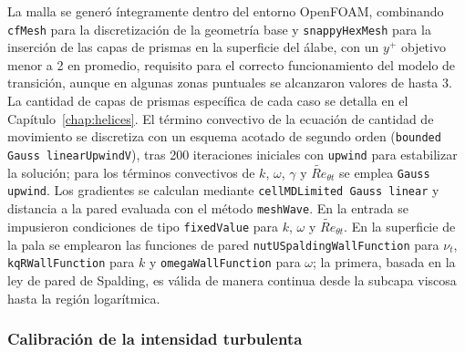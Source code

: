 La malla se generó íntegramente dentro del entorno OpenFOAM, combinando
\texttt{cfMesh} para la discretización de la geometría base y \texttt{snappyHexMesh}
para la inserción de las capas de prismas en la superficie del álabe, con un $y^+$
objetivo menor a 2 en promedio, requisito para el correcto funcionamiento del modelo
de transición, aunque en algunas zonas puntuales se alcanzaron valores de hasta 3.
La cantidad de capas de prismas específica de cada caso se detalla en el
Capítulo~\ref{chap:helices}. El término convectivo de la ecuación de cantidad de movimiento se discretiza con un esquema acotado de segundo orden
(\texttt{bounded Gauss linearUpwindV}), tras 200 iteraciones iniciales con \texttt{upwind}
para estabilizar la solución; para los términos convectivos de $k$, $\omega$, $\gamma$ y
$\widetilde{Re}_{\theta t}$ se emplea \texttt{Gauss upwind}. Los gradientes se calculan mediante
\texttt{cellMDLimited Gauss linear} y distancia a la pared evaluada con el método
\texttt{meshWave}. En la entrada se impusieron condiciones de tipo
\texttt{fixedValue} para $k$, $\omega$ y $\widetilde{Re}_{\theta t}$. En la superficie de la pala se emplearon las funciones de pared
\texttt{nutUSpaldingWallFunction} para $\nu_t$, \texttt{kqRWallFunction} para $k$ y
\texttt{omegaWallFunction} para $\omega$; la primera, basada en la ley de pared de Spalding,
es válida de manera continua desde la subcapa viscosa hasta la región logarítmica.

\subsubsection{Calibración de la intensidad turbulenta}
\label{sec:metodologia_helices_tu}

